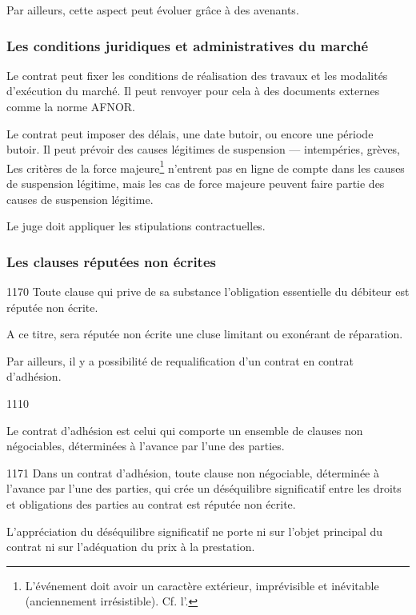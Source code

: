 			Par ailleurs, cette aspect peut évoluer grâce à des avenants.

			\subsubsection{Les conditions juridiques et administratives du marché}

			Le contrat peut fixer les conditions de réalisation des travaux et les modalités d'exécution du marché. Il peut renvoyer pour cela à des documents externes comme la norme AFNOR.

			Le contrat peut imposer des délais, une date butoir, ou encore une période butoir. Il peut prévoir des causes légitimes de suspension --- intempéries, grèves, \etc
			Les critères de la force majeure\footnote{L’événement doit avoir un caractère extérieur, imprévisible et inévitable (anciennement irrésistible). Cf. l'.} n'entrent pas en ligne de compte dans les causes de suspension légitime, mais les cas de force majeure peuvent faire partie des causes de suspension légitime.

			Le juge doit appliquer les stipulations contractuelles.

			\subsubsection{Les clauses réputées non écrites}

			\begin{citationArticleCciv}{1170}
				Toute clause qui prive de sa substance l'obligation essentielle du débiteur est réputée non écrite.
			\end{citationArticleCciv}

			A ce titre, sera réputée non écrite une cluse limitant ou exonérant de réparation.

			\bigskip Par ailleurs, il y a possibilité de requalification d'un contrat en contrat d'adhésion.
			\begin{citationArticleCciv}{1110}
				\lips

				Le contrat d'adhésion est celui qui comporte un ensemble de clauses non négociables, déterminées à l'avance par l'une des parties.
			\end{citationArticleCciv}


			\begin{citationArticleCciv}{1171}
				Dans un contrat d'adhésion, toute clause non négociable, déterminée à l'avance par l'une des parties, qui crée un déséquilibre significatif entre les droits et obligations des parties au contrat est réputée non écrite.

				L'appréciation du déséquilibre significatif ne porte ni sur l'objet principal du contrat ni sur l'adéquation du prix à la prestation.
			\end{citationArticleCciv}

